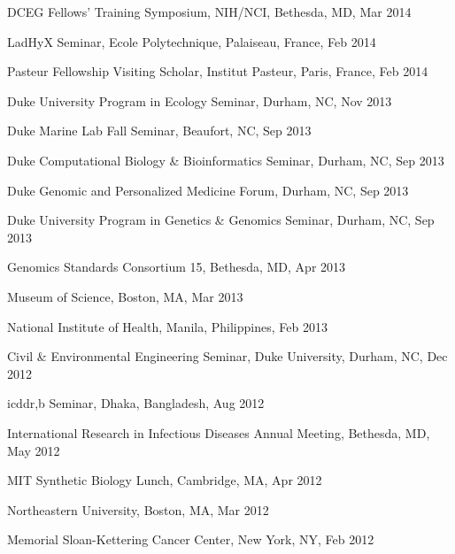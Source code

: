 \documentclass[overlapped,line,11pt]{res}
\begin{document}
\begin{resume}
\begin{revnumerate}[69]
\item {DCEG Fellows’ Training Symposium, NIH/NCI, Bethesda, MD, Mar 2014
  }

\item {LadHyX Seminar, Ecole
  Polytechnique, Palaiseau, France, Feb 2014}

\item {Pasteur Fellowship Visiting Scholar, Institut Pasteur,
  Paris, France, Feb 2014}

\item {Duke University Program in Ecology Seminar,
  Durham, NC, Nov 2013}

\item {Duke Marine Lab Fall Seminar,
  Beaufort, NC, Sep 2013}

\item {Duke Computational Biology \& Bioinformatics Seminar,
  Durham, NC, Sep 2013}

\item {Duke Genomic and Personalized Medicine Forum,
  Durham, NC, Sep 2013}

\item {Duke University Program in Genetics \& Genomics Seminar,
  Durham, NC, Sep 2013}

\item {Genomics Standards Consortium 15,
  Bethesda, MD, Apr 2013}

\item {Museum of Science, Boston,
  MA, Mar 2013}

\item {National Institute of Health, Manila,
  Philippines, Feb 2013}

\item {Civil \& Environmental Engineering Seminar, Duke University,
  Durham, NC, Dec 2012}

\item {icddr,b Seminar, Dhaka,
  Bangladesh, Aug 2012}

\item {International Research in
  Infectious Diseases Annual Meeting, Bethesda, MD, May 2012}

\item {MIT Synthetic Biology Lunch, Cambridge, MA, Apr 2012}

\item {Northeastern University, Boston, MA, Mar 2012}

\item {Memorial Sloan-Kettering Cancer Center, New York, NY,
  Feb 2012}


\end{revnumerate}
\end{resume}
\end{document}
